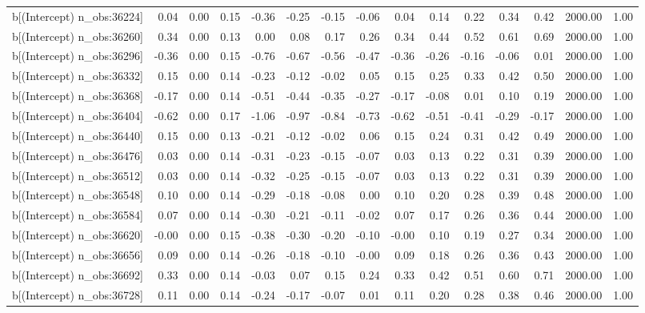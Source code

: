 \begin{table}[ht]
\begin{tabular}{rrrrrrrrrrrrrrr}
  b[(Intercept) n\_obs:36224] & 0.04 & 0.00 & 0.15 & -0.36 & -0.25 & -0.15 & -0.06 & 0.04 & 0.14 & 0.22 & 0.34 & 0.42 & 2000.00 & 1.00 \\ 
  b[(Intercept) n\_obs:36260] & 0.34 & 0.00 & 0.13 & 0.00 & 0.08 & 0.17 & 0.26 & 0.34 & 0.44 & 0.52 & 0.61 & 0.69 & 2000.00 & 1.00 \\ 
  b[(Intercept) n\_obs:36296] & -0.36 & 0.00 & 0.15 & -0.76 & -0.67 & -0.56 & -0.47 & -0.36 & -0.26 & -0.16 & -0.06 & 0.01 & 2000.00 & 1.00 \\ 
  b[(Intercept) n\_obs:36332] & 0.15 & 0.00 & 0.14 & -0.23 & -0.12 & -0.02 & 0.05 & 0.15 & 0.25 & 0.33 & 0.42 & 0.50 & 2000.00 & 1.00 \\ 
  b[(Intercept) n\_obs:36368] & -0.17 & 0.00 & 0.14 & -0.51 & -0.44 & -0.35 & -0.27 & -0.17 & -0.08 & 0.01 & 0.10 & 0.19 & 2000.00 & 1.00 \\ 
  b[(Intercept) n\_obs:36404] & -0.62 & 0.00 & 0.17 & -1.06 & -0.97 & -0.84 & -0.73 & -0.62 & -0.51 & -0.41 & -0.29 & -0.17 & 2000.00 & 1.00 \\ 
  b[(Intercept) n\_obs:36440] & 0.15 & 0.00 & 0.13 & -0.21 & -0.12 & -0.02 & 0.06 & 0.15 & 0.24 & 0.31 & 0.42 & 0.49 & 2000.00 & 1.00 \\ 
  b[(Intercept) n\_obs:36476] & 0.03 & 0.00 & 0.14 & -0.31 & -0.23 & -0.15 & -0.07 & 0.03 & 0.13 & 0.22 & 0.31 & 0.39 & 2000.00 & 1.00 \\ 
  b[(Intercept) n\_obs:36512] & 0.03 & 0.00 & 0.14 & -0.32 & -0.25 & -0.15 & -0.07 & 0.03 & 0.13 & 0.22 & 0.31 & 0.39 & 2000.00 & 1.00 \\ 
  b[(Intercept) n\_obs:36548] & 0.10 & 0.00 & 0.14 & -0.29 & -0.18 & -0.08 & 0.00 & 0.10 & 0.20 & 0.28 & 0.39 & 0.48 & 2000.00 & 1.00 \\ 
  b[(Intercept) n\_obs:36584] & 0.07 & 0.00 & 0.14 & -0.30 & -0.21 & -0.11 & -0.02 & 0.07 & 0.17 & 0.26 & 0.36 & 0.44 & 2000.00 & 1.00 \\ 
  b[(Intercept) n\_obs:36620] & -0.00 & 0.00 & 0.15 & -0.38 & -0.30 & -0.20 & -0.10 & -0.00 & 0.10 & 0.19 & 0.27 & 0.34 & 2000.00 & 1.00 \\ 
  b[(Intercept) n\_obs:36656] & 0.09 & 0.00 & 0.14 & -0.26 & -0.18 & -0.10 & -0.00 & 0.09 & 0.18 & 0.26 & 0.36 & 0.43 & 2000.00 & 1.00 \\ 
  b[(Intercept) n\_obs:36692] & 0.33 & 0.00 & 0.14 & -0.03 & 0.07 & 0.15 & 0.24 & 0.33 & 0.42 & 0.51 & 0.60 & 0.71 & 2000.00 & 1.00 \\ 
  b[(Intercept) n\_obs:36728] & 0.11 & 0.00 & 0.14 & -0.24 & -0.17 & -0.07 & 0.01 & 0.11 & 0.20 & 0.28 & 0.38 & 0.46 & 2000.00 & 1.00 \\ 

\end{tabular}
\end{table}
